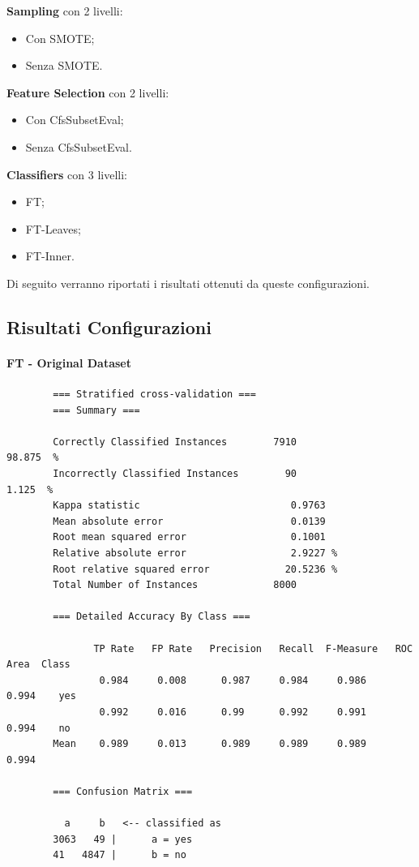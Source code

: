 \textbf{Sampling} con 2 livelli:
\begin{itemize}
	\item Con SMOTE;
	\item Senza SMOTE.
\end{itemize}
\textbf{Feature Selection} con 2 livelli:
\begin{itemize}
	\item Con CfsSubsetEval;
	\item Senza CfsSubsetEval.
\end{itemize}
\textbf{Classifiers} con 3 livelli:
\begin{itemize}
	\item FT;
	\item FT-Leaves;
	\item FT-Inner.
\end{itemize}
Di seguito verranno riportati i risultati ottenuti da queste configurazioni. 
\subsection{Risultati Configurazioni}
\paragraph{FT - Original Dataset}
{\footnotesize
	\begin{verbatim}
		=== Stratified cross-validation ===
		=== Summary ===
		
		Correctly Classified Instances        7910               98.875  %
		Incorrectly Classified Instances        90                1.125  %
		Kappa statistic                          0.9763
		Mean absolute error                      0.0139
		Root mean squared error                  0.1001
		Relative absolute error                  2.9227 %
		Root relative squared error             20.5236 %
		Total Number of Instances             8000     
		
		=== Detailed Accuracy By Class ===
		
		       TP Rate   FP Rate   Precision   Recall  F-Measure   ROC Area  Class
		        0.984     0.008      0.987     0.984     0.986      0.994    yes
		        0.992     0.016      0.99      0.992     0.991      0.994    no
		Mean    0.989     0.013      0.989     0.989     0.989      0.994
		
		=== Confusion Matrix ===
		
		  a     b   <-- classified as
		3063   49 |      a = yes
		41   4847 |      b = no
	\end{verbatim}
}

